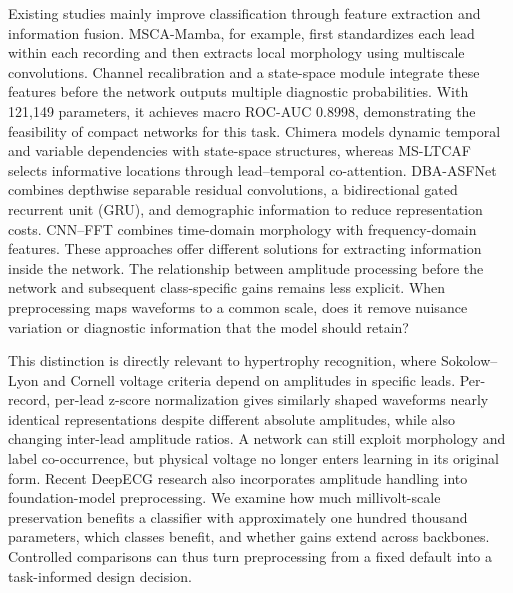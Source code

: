 \documentclass[11pt,a4paper]{article}
\begin{document}
Existing studies mainly improve classification through feature extraction and information fusion. MSCA-Mamba\cite{cetintas2026}, for example, first standardizes each lead within each recording and then extracts local morphology using multiscale convolutions. Channel recalibration and a state-space module integrate these features before the network outputs multiple diagnostic probabilities. With 121,149 parameters, it achieves macro ROC-AUC 0.8998, demonstrating the feasibility of compact networks for this task. Chimera\cite{behrouz2024} models dynamic temporal and variable dependencies with state-space structures, whereas MS-LTCAF\cite{feng2025} selects informative locations through lead--temporal co-attention. DBA-ASFNet\cite{luo2025} combines depthwise separable residual convolutions, a bidirectional gated recurrent unit (GRU), and demographic information to reduce representation costs. CNN--FFT\cite{malik2026} combines time-domain morphology with frequency-domain features. These approaches offer different solutions for extracting information inside the network. The relationship between amplitude processing before the network and subsequent class-specific gains remains less explicit. When preprocessing maps waveforms to a common scale, does it remove nuisance variation or diagnostic information that the model should retain?

This distinction is directly relevant to hypertrophy recognition, where Sokolow--Lyon and Cornell voltage criteria depend on amplitudes in specific leads\cite{sokolow1949,casale1985,hancock2009}. Per-record, per-lead z-score normalization gives similarly shaped waveforms nearly identical representations despite different absolute amplitudes, while also changing inter-lead amplitude ratios. A network can still exploit morphology and label co-occurrence, but physical voltage no longer enters learning in its original form. Recent DeepECG research also incorporates amplitude handling into foundation-model preprocessing\cite{nolin2026}. We examine how much millivolt-scale preservation benefits a classifier with approximately one hundred thousand parameters, which classes benefit, and whether gains extend across backbones. Controlled comparisons can thus turn preprocessing from a fixed default into a task-informed design decision.
\end{document}
